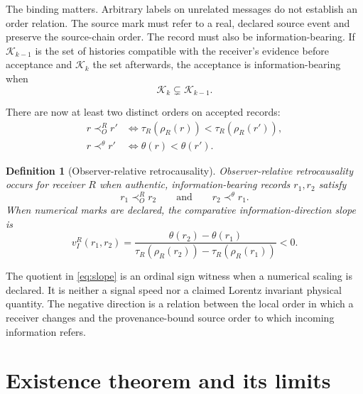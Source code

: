 \documentclass[11pt]{article}
\newtheorem{definition}{Definition}[section]
\theoremstyle{remark}
\newcommand{\receive}{\prec_{\!O}^{R}}
\newcommand{\sourceorder}{\prec^{\theta}}
\begin{document}
The binding matters.  Arbitrary labels on unrelated messages do not establish
an order relation.  The source mark must refer to a real, declared source
event and preserve the source-chain order.  The record must also be
information-bearing.  If $\mathcal{K}_{k-1}$ is the set of histories
compatible with the receiver's evidence before acceptance and
$\mathcal{K}_k$ the set afterwards, the acceptance is information-bearing
when
\begin{equation}
  \mathcal{K}_k\subsetneq\mathcal{K}_{k-1}.
  \label{eq:information}
\end{equation}

There are now at least two distinct orders on accepted records:
\begin{align}
 r\receive r' &\Longleftrightarrow
   \tau_R(\rho_R(r))<\tau_R(\rho_R(r')),\\
 r\sourceorder r' &\Longleftrightarrow
   \theta(r)<\theta(r').
\end{align}

\begin{definition}[Observer-relative retrocausality]
\label{def:orr}
Observer-relative retrocausality occurs for receiver $R$ when authentic,
information-bearing records $r_1,r_2$ satisfy
\begin{equation}
  r_1\receive r_2\qquad\text{and}\qquad r_2\sourceorder r_1.
  \label{eq:inverse}
\end{equation}
When numerical marks are declared, the comparative information-direction
slope is
\begin{equation}
  v_I^R(r_1,r_2)=
  \frac{\theta(r_2)-\theta(r_1)}
       {\tau_R(\rho_R(r_2))-\tau_R(\rho_R(r_1))}<0.
  \label{eq:slope}
\end{equation}
\end{definition}

The quotient in \cref{eq:slope} is an ordinal sign witness when a numerical
scaling is declared.  It is neither a signal speed nor a claimed Lorentz
invariant physical quantity.  The negative direction is a relation between
the local order in which a receiver changes and the provenance-bound source
order to which incoming information refers.

\section{Existence theorem and its limits}
\label{sec:theorem}
\end{document}
